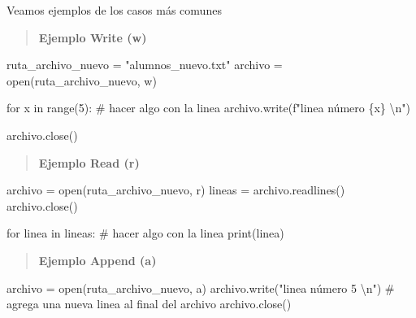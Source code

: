 \documentclass[
  letterpaper,
  DIV=11,
  numbers=noendperiod]{scrreprt}
\newenvironment{Shaded}{\begin{snugshade}}{\end{snugshade}}
\newcommand{\BuiltInTok}[1]{\textcolor[rgb]{0.00,0.23,0.31}{#1}}
\newcommand{\CharTok}[1]{\textcolor[rgb]{0.13,0.47,0.30}{#1}}
\newcommand{\CommentTok}[1]{\textcolor[rgb]{0.37,0.37,0.37}{#1}}
\newcommand{\ControlFlowTok}[1]{\textcolor[rgb]{0.00,0.23,0.31}{#1}}
\newcommand{\DecValTok}[1]{\textcolor[rgb]{0.68,0.00,0.00}{#1}}
\newcommand{\KeywordTok}[1]{\textcolor[rgb]{0.00,0.23,0.31}{#1}}
\newcommand{\NormalTok}[1]{\textcolor[rgb]{0.00,0.23,0.31}{#1}}
\newcommand{\OperatorTok}[1]{\textcolor[rgb]{0.37,0.37,0.37}{#1}}
\newcommand{\SpecialCharTok}[1]{\textcolor[rgb]{0.37,0.37,0.37}{#1}}
\newcommand{\SpecialStringTok}[1]{\textcolor[rgb]{0.13,0.47,0.30}{#1}}
\newcommand{\StringTok}[1]{\textcolor[rgb]{0.13,0.47,0.30}{#1}}
\begin{document}
Veamos ejemplos de los casos más comunes

\begin{quote}
\textbf{Ejemplo Write (w)}
\end{quote}

\begin{Shaded}
\begin{Highlighting}[]
\NormalTok{ruta\_archivo\_nuevo }\OperatorTok{=} \StringTok{"alumnos\_nuevo.txt"}
\NormalTok{archivo }\OperatorTok{=} \BuiltInTok{open}\NormalTok{(ruta\_archivo\_nuevo, }\StringTok{\textquotesingle{}w\textquotesingle{}}\NormalTok{)}

\ControlFlowTok{for}\NormalTok{ x }\KeywordTok{in} \BuiltInTok{range}\NormalTok{(}\DecValTok{5}\NormalTok{):}
  \CommentTok{\# hacer algo con la linea}
\NormalTok{  archivo.write(}\SpecialStringTok{f"linea número }\SpecialCharTok{\{}\NormalTok{x}\SpecialCharTok{\}}\SpecialStringTok{ }\CharTok{\textbackslash{}n}\SpecialStringTok{"}\NormalTok{)}

\NormalTok{archivo.close()}
\end{Highlighting}
\end{Shaded}

\begin{quote}
\textbf{Ejemplo Read (r)}
\end{quote}

\begin{Shaded}
\begin{Highlighting}[]
\NormalTok{archivo }\OperatorTok{=} \BuiltInTok{open}\NormalTok{(ruta\_archivo\_nuevo, }\StringTok{\textquotesingle{}r\textquotesingle{}}\NormalTok{)}
\NormalTok{lineas }\OperatorTok{=}\NormalTok{ archivo.readlines()}
\NormalTok{archivo.close()}

\ControlFlowTok{for}\NormalTok{ linea }\KeywordTok{in}\NormalTok{ lineas:}
  \CommentTok{\# hacer algo con la linea}
  \BuiltInTok{print}\NormalTok{(linea)}
\end{Highlighting}
\end{Shaded}

\begin{quote}
\textbf{Ejemplo Append (a)}
\end{quote}

\begin{Shaded}
\begin{Highlighting}[]
\NormalTok{archivo }\OperatorTok{=} \BuiltInTok{open}\NormalTok{(ruta\_archivo\_nuevo, }\StringTok{\textquotesingle{}a\textquotesingle{}}\NormalTok{)}
\NormalTok{archivo.write(}\StringTok{"linea número 5 }\CharTok{\textbackslash{}n}\StringTok{"}\NormalTok{) }\CommentTok{\# agrega una nueva linea al final del archivo}
\NormalTok{archivo.close()}
\end{Highlighting}
\end{Shaded}
\end{document}
